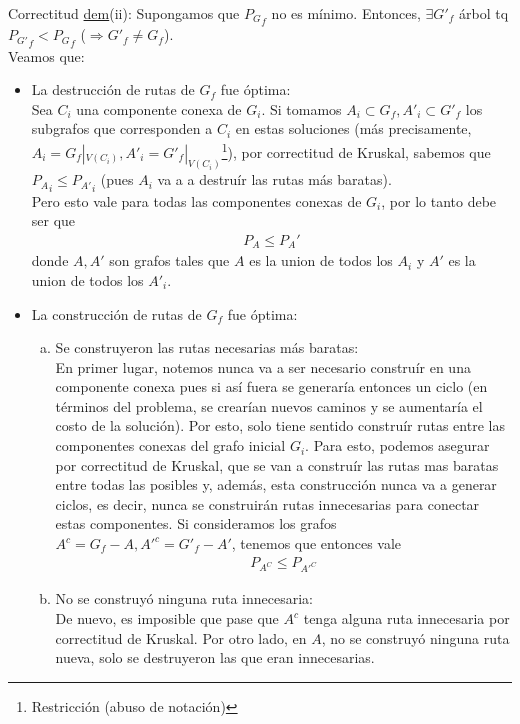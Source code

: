\documentclass[a4paper]{article}
\begin{document}
\begin{subsection}{Correctitud}
\underline{dem}(ii): Supongamos que ${P_G}_f$ no es m\'{i}nimo. Entonces, $\exists G'_f$ \'{a}rbol tq ${P_{G'}}_f < {P_G}_f  $  ($\Rightarrow G'_f \neq G_f$). \\ 
Veamos que:
\begin{itemize}
	\item{La destrucci\'{o}n de rutas de $G_f$ fue \'{o}ptima: \\ Sea $C_i$ una componente conexa de $G_i$. Si tomamos $A_i \subset G_f, A'_i \subset G'_f$ los subgrafos que corresponden a $C_i$ en estas soluciones (m\'{a}s precisamente, $A_i = G_f |_{V(C_i)}, A'_i = G'_f |_{V(C_i)}$\footnote{Restricci\'{o}n (abuso de notaci\'{o}n)}), por correctitud de Kruskal, sabemos que ${P_A}_i \leq {P_{A'}}_i$ (pues $A_i$ va a a destru\'{i}r las rutas m\'{a}s baratas). \\
Pero esto vale para todas las componentes conexas de $G_i$, por lo tanto debe ser que
\begin{align*}
P_A \leq P_A'
\end{align*}
donde $A, A'$ son grafos tales que $A$ es la union de todos los $A_i$ y $A'$ es la union de todos los ${A'}_i$. }
	\item{La construcci\'{o}n de rutas de $G_f$ fue \'{o}ptima: }
    \begin{enumerate}[(a)]
    	\item{Se construyeron las rutas necesarias m\'{a}s baratas: \\ 
En primer lugar, notemos nunca va a ser necesario constru\'{i}r en una componente conexa pues si as\'{i} fuera se generar\'{i}a entonces un ciclo (en t\'{e}rminos del problema, se crear\'{i}an nuevos caminos y se aumentar\'{i}a el costo de la soluci\'{o}n). Por esto, solo tiene sentido constru\'{i}r rutas entre las componentes conexas del grafo inicial $G_i$. Para esto, podemos asegurar por correctitud de Kruskal, que se van a constru\'{i}r las rutas mas baratas entre todas las posibles y, adem\'{a}s, esta construcci\'{o}n nunca va a generar ciclos, es decir, nunca se construir\'{a}n rutas innecesarias para conectar estas componentes. Si consideramos los grafos $A^c = G_f - A, {A'}^c =  {{G'}_f} - A'$, tenemos que entonces vale 
\begin{align*}
P_{A^C} \leq P_{{A'}^C}
\end{align*}
        }
        \item{No se construy\'{o} ninguna ruta innecesaria: \\ De nuevo, es imposible que pase que $A^c$ tenga alguna ruta innecesaria por correctitud de Kruskal.  Por otro lado, en $A$, no se construy\'{o} ninguna ruta nueva, solo se destruyeron las que eran innecesarias.  }
        

\end{enumerate}
\end{itemize}
\end{subsection}
\end{document}
